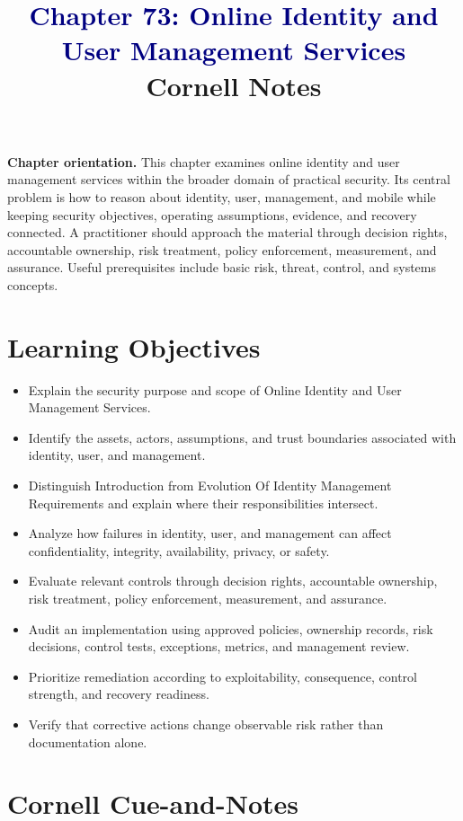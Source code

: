 \documentclass[11pt]{article}
\title{\textcolor{Navy}{Chapter 73: Online Identity and User Management Services}\\[2mm]\large Cornell Notes}
\author{}
\date{}
\begin{document}
\maketitle
\thispagestyle{fancy}
\vspace{-1.5em}
\begin{orientationbox}
\textbf{Chapter orientation.} This chapter examines online identity and user management services within the broader domain of practical security. Its central problem is how to reason about identity, user, management, and mobile while keeping security objectives, operating assumptions, evidence, and recovery connected. A practitioner should approach the material through decision rights, accountable ownership, risk treatment, policy enforcement, measurement, and assurance. Useful prerequisites include basic risk, threat, control, and systems concepts.
\end{orientationbox}
\section*{Learning Objectives}
\begin{itemize}
\item Explain the security purpose and scope of Online Identity and User Management Services.
\item Identify the assets, actors, assumptions, and trust boundaries associated with identity, user, and management.
\item Distinguish Introduction from Evolution Of Identity Management Requirements and explain where their responsibilities intersect.
\item Analyze how failures in identity, user, and management can affect confidentiality, integrity, availability, privacy, or safety.
\item Evaluate relevant controls through decision rights, accountable ownership, risk treatment, policy enforcement, measurement, and assurance.
\item Audit an implementation using approved policies, ownership records, risk decisions, control tests, exceptions, metrics, and management review.
\item Prioritize remediation according to exploitability, consequence, control strength, and recovery readiness.
\item Verify that corrective actions change observable risk rather than documentation alone.
\end{itemize}
\section*{Cornell Cue-and-Notes}
\end{document}
